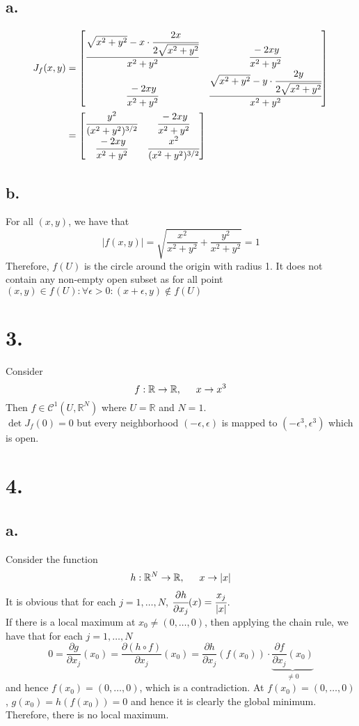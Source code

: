 \documentclass[11pt]{article}
\begin{document}
\subsection*{a.}
\begin{equation*}
    \begin{aligned}
        J_f(x,y) &= 
        \begin{bmatrix}
            \cfrac{\sqrt{x^2+y^2} - x \cdot \cfrac{2x}{2\sqrt{x^2+y^2}}}{x^2+y^2} & \cfrac{-2xy}{x^2+y^2}\\
            \cfrac{-2xy}{x^2+y^2} & \cfrac{\sqrt{x^2+y^2} - y \cdot \cfrac{2y}{2\sqrt{x^2+y^2}}}{x^2+y^2}
        \end{bmatrix}  \\
        &=  
        \begin{bmatrix}
            \cfrac{y^2}{(x^2+y^2)^{3/2}} & \cfrac{-2xy}{x^2+y^2} \\
            \cfrac{-2xy}{x^2+y^2} & \cfrac{x^2}{(x^2+y^2)^{3/2}}
        \end{bmatrix} 
    \end{aligned}
\end{equation*}
\subsection*{b.}
For all $(x,y)$, we have that 
\[
    |f(x,y)| = \sqrt{\frac{x^2}{x^2 + y^2} + \frac{y^2}{x^2 + y^2}} = 1    
\]
Therefore, $f(U)$ is the circle around the origin with radius 1. It does not contain any non-empty open 
subset as for all point $(x,y) \in f(U): \forall \epsilon >0: (x+\epsilon, y) \notin f(U)$
\pagebreak
\section*{3.}
Consider 
\[
    f: \mathbb{R} \to \mathbb{R}, \indent x \to x^3
\]
Then $f \in \mathcal{C}^1(U,\mathbb{R}^N)$ where $U = \mathbb{R}$ and $N=1$. \\
$\det J_f(0) = 0$ but every neighborhood $(-\epsilon , \epsilon)$ is mapped to $(-\epsilon^3, \epsilon^3)$ which is open. 
\pagebreak
\section*{4.}
\subsection*{a.}
Consider the function 
\[
    h: \mathbb{R}^N \to \mathbb{R}, \indent x \to |x|    
\]
It is obvious that for each $j=1, \ldots ,N$, $\cfrac{\partial h}{\partial x_j}(x) = \cfrac{x_j}{|x|}$. \\
If there is a local maximum at $x_0 \ne (0,\ldots, 0)$, then applying the chain rule, we have that for each $j = 1, \ldots ,N$
\[
    0 = \frac{\partial g}{\partial x_j}(x_0) = 
    \frac{\partial (h \circ f)}{\partial x_j}(x_0) = \frac{\partial h}{\partial x_j}(f(x_0)) 
    \cdot \underbrace{\frac{\partial f}{\partial x_j}(x_0)}_{\ne 0}
\]
and hence $f(x_0) = (0,\ldots ,0)$, which is a contradiction. At $f(x_0) = (0,\ldots,0)$, 
$g(x_0)= h(f(x_0))=0$ and hence it is clearly the global minimum. Therefore, there is no local maximum.  
\end{document}
